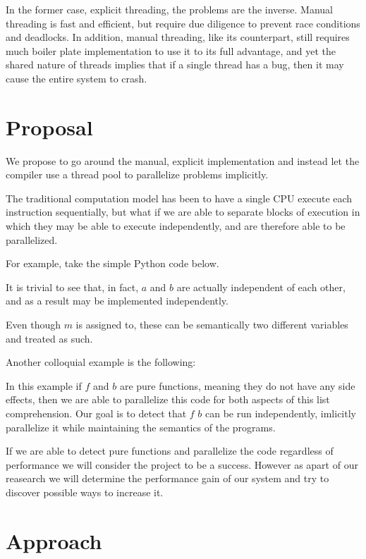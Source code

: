 \documentclass{article}
\begin{document}
\begin{multicols}{2}
In the former case, explicit threading, the problems are the inverse.
Manual threading is fast and efficient, but require due diligence to 
prevent race conditions and deadlocks. In addition, manual threading,
like its counterpart, still requires much boiler plate implementation
to use it to its full advantage, and yet the shared nature of threads
implies that if a single thread has a bug, then it may cause the entire
system to crash.

\section{Proposal}

We propose to go around the manual, explicit implementation and instead
let the compiler use a thread pool to parallelize problems implicitly.

The traditional computation model has been to have a single CPU execute
each instruction sequentially, but what if we are able to separate blocks
of execution in which they may be able to execute independently, and are
therefore able to be parallelized.

For example, take the simple Python code below.


It is trivial to see that, in fact, $a$ and $b$ are actually independent of
each other, and as a result may be implemented independently.

Even though $m$ is assigned to, these can be semantically two different variables
and treated as such.

Another colloquial example is the following: 


In this example if $f$ and $b$ are pure functions, meaning they do not have any
side effects, then we are able to parallelize this code for both aspects of
this list comprehension. Our goal is to detect that $f$ $b$ can be run
independently, imlicitly parallelize it while maintaining the semantics of the
programs.

If we are able to detect pure functions and parallelize the code regardless of
performance we will consider the project to be a success. However as apart of
our reasearch we will determine the performance gain of our system and try to
discover possible ways to increase it.

\section{Approach}


\end{multicols}
\end{document}
